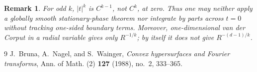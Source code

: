 \documentclass[11pt]{amsart}
\newtheorem{remark}[theorem]{Remark}
\begin{document}
\begin{remark}
For odd \(k\), \(|t|^k\) is \(C^{k-1}\), not \(C^k\), at zero. Thus one
may neither apply a globally smooth stationary-phase theorem nor integrate
by parts across \(t=0\) without tracking one-sided boundary terms.
Moreover, one-dimensional van der Corput in a radial variable gives only
\(R^{-1/k}\); by itself it does not give \(R^{-(d-1)/k}\).
\end{remark}

\begin{thebibliography}{9}
J.~Bruna, A.~Nagel, and S.~Wainger,
\emph{Convex hypersurfaces and Fourier transforms},
Ann. of Math. (2) \textbf{127} (1988), no.~2, 333--365.
\end{thebibliography}
\end{document}
